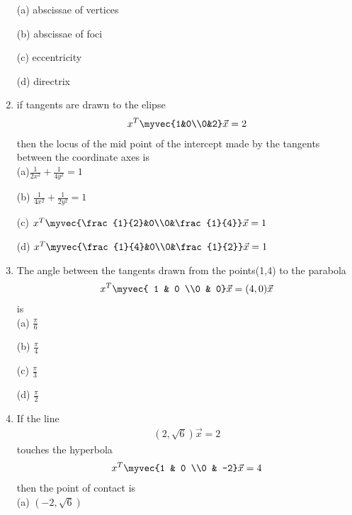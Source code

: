 \begin{enumerate}
    \choice (a) abscissae of vertices
    
    \choice (b) abscissae of foci
    
    \choice (c) eccentricity
    
    \choice (d) directrix\\
    
    \item if tangents are drawn to the elipse \begin{align} x^T\myvec{1&0\\0&2}\vec x=2\end{align} then the locus of the mid point of the intercept made by the tangents between the coordinate axes is\\
    \choice (a)$\frac{1}{2x^2}+\frac{1}{4y^2}=1$
    
    \choice (b) $\frac{1}{4x^2}+\frac{1}{2y^2}=1$
    
    \choice (c) $ x^T\myvec{\frac{1}{2}&0\\0&\frac{1}{4}}\vec x=1$
    
    \choice (d) $ x^T\myvec{\frac{1}{4}&0\\0&\frac{1}{2}}\vec x=1$\\
    
    \item The angle between the tangents drawn from the points(1,4) to the parabola \begin{align} x^T\myvec{
    1 & 0 \\0 & 0}\vec x=(4,0)\vec x \end{align} is\\ 
    
    \choice (a) $\frac{\pi}{6}$
    
    \choice (b) $\frac{\pi}{4}$
    
    \choice (c) $\frac{\pi}{3}$
    
    \choice (d) $\frac{\pi}{2}$\\
    
    \item If the line \begin{align}(2,\sqrt{6})\vec x=2\end{align} touches the hyperbola\begin{align}x^T\myvec{1 & 0 \\0 & -2} \vec x=4\end{align}then the point of contact is\\ 
    
    \choice (a) $(-2,\sqrt{6})$
    

\end{enumerate}
